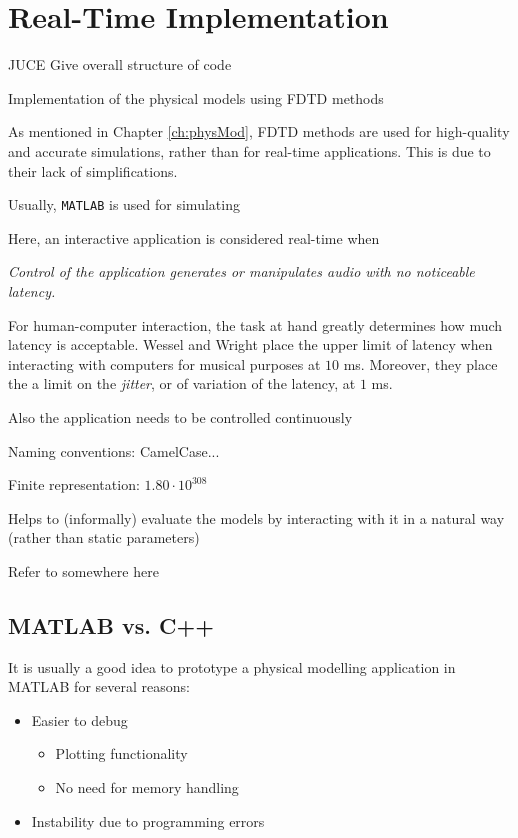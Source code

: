 \chapter{Real-Time Implementation}
JUCE
Give overall structure of code


Implementation of the physical models
using FDTD methods

As mentioned in Chapter \ref{ch:physMod}, FDTD methods are used for high-quality and accurate simulations, rather than for real-time applications. This is due to their lack of simplifications.

Usually, \texttt{MATLAB} is used for simulating 

Here, an interactive application is considered real-time when
\begin{center}\it
    Control of the application generates or manipulates audio with no noticeable latency.
\end{center}

For human-computer interaction, the task at hand greatly determines how much latency is acceptable. Wessel and Wright \cite{Wessel2002} place the upper limit of latency when interacting with computers for musical purposes at $10$ ms. Moreover, they place the a limit on the \textit{jitter}, or of variation of the latency, at $1$ ms. 

Also the application needs to be controlled continuously

Naming conventions: CamelCase...

Finite representation: $1.80\cdot 10^{308}$

Helps to (informally) evaluate the models by interacting with it in a natural way (rather than static parameters)
 
Refer to \cite{Webb2015} somewhere here

\section{MATLAB vs. C++}
It is usually a good idea to prototype a physical modelling application in MATLAB for several reasons:
\begin{itemize}
    \item Easier to debug
    \begin{itemize}
        \item Plotting functionality
        \item No need for memory handling
    \end{itemize}
    \item Instability due to programming errors 
\end{itemize}

